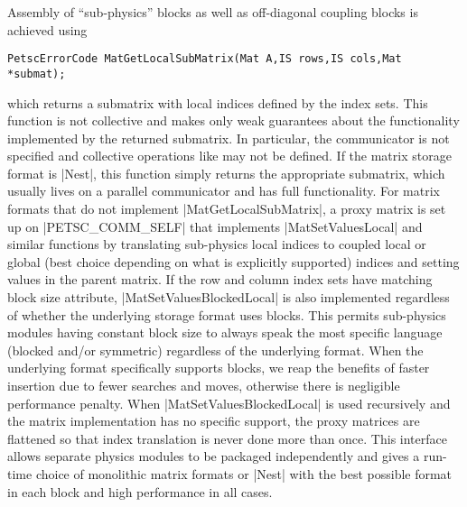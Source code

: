 Assembly of ``sub-physics'' blocks as well as off-diagonal coupling blocks is achieved using
\begin{verbatim}
PetscErrorCode MatGetLocalSubMatrix(Mat A,IS rows,IS cols,Mat *submat);
\end{verbatim}
which returns a submatrix with local indices defined by the index sets.
This function is not collective and makes only weak guarantees about the functionality implemented by the returned submatrix.
In particular, the communicator is not specified and collective operations like {\MatMult} may not be defined.
If the matrix storage format is \cverb|Nest|, this function simply returns the appropriate submatrix, which usually lives on a parallel communicator and has full functionality.
For matrix formats that do not implement \cfunc|MatGetLocalSubMatrix|, a proxy matrix is set up on \cverb|PETSC_COMM_SELF| that implements \cfunc|MatSetValuesLocal| and similar functions by translating sub-physics local indices to coupled local or global (best choice depending on what is explicitly supported) indices and setting values in the parent matrix.
If the row and column index sets have matching block size attribute, \cfunc|MatSetValuesBlockedLocal| is also implemented regardless of whether the underlying storage format uses blocks.
This permits sub-physics modules having constant block size to always speak the most specific language (blocked and/or symmetric) regardless of the underlying format.
When the underlying format specifically supports blocks, we reap the benefits of faster insertion due to fewer searches and moves, otherwise there is negligible performance penalty.
When \cfunc|MatSetValuesBlockedLocal| is used recursively and the matrix implementation has no specific support, the proxy matrices are flattened so that index translation is never done more than once.
This interface allows separate physics modules to be packaged independently and gives a run-time choice of monolithic matrix formats or \cverb|Nest| with the best possible format in each block and high performance in all cases.
